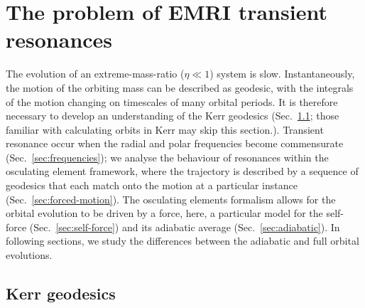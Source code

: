 \documentclass[aps,prd,amsfonts,amssymb,amsmath,nofootinbib,showpacs,superscriptaddress,twocolumn,floatfix]{revtex4-1}
\newcommand{\secref}[1]{Sec.~\ref{sec:#1}}
\begin{document}
\section{The problem of EMRI transient resonances}
\label{sec:problem}

The evolution of an extreme-mass-ratio ($\eta \ll 1$) system is slow. Instantaneously, the motion of the orbiting mass can be described as geodesic, with the integrals of the motion changing on timescales of many orbital periods. It is therefore necessary to develop an understanding of the Kerr geodesics (\secref{geodesic}; those familiar with calculating orbits in Kerr may skip this section.). Transient resonance occur when the radial and polar frequencies become commensurate (\secref{frequencies}); we analyse the behaviour of resonances within the osculating element framework, where the trajectory is described by a sequence of geodesics that each match onto the motion at a particular instance (\secref{forced-motion}). The osculating elements formalism allows for the orbital evolution to be driven by a force, here, a particular model for the self-force (\secref{self-force}) and its adiabatic average (\secref{adiabatic}). In following sections, we study the differences between the adiabatic and full orbital evolutions.

\subsection{Kerr geodesics}
\label{sec:geodesic}
\end{document}
